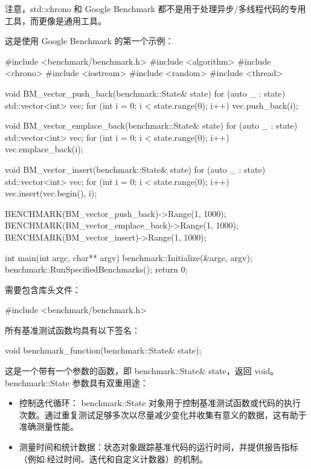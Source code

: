 注意，std::chrono 和 Google Benchmark 都不是用于处理异步/多线程代码的专用工具，而更像是通用工具。

这是使用 Google Benchmark 的第一个示例：

\begin{cpp}
#include <benchmark/benchmark.h>
#include <algorithm>
#include <chrono>
#include <iostream>
#include <random>
#include <thread>

void BM_vector_push_back(benchmark::State& state) {
    for (auto _ : state) {
        std::vector<int> vec;
        for (int i = 0; i < state.range(0); i++) {
            vec.push_back(i);
        }
    }
}

void BM_vector_emplace_back(benchmark::State& state) {
    for (auto _ : state) {
        std::vector<int> vec;
        for (int i = 0; i < state.range(0); i++) {
            vec.emplace_back(i);
        }
    }
}

void BM_vector_insert(benchmark::State& state) {
    for (auto _ : state) {
        std::vector<int> vec;
        for (int i = 0; i < state.range(0); i++) {
            vec.insert(vec.begin(), i);
        }
    }
}

BENCHMARK(BM_vector_push_back)->Range(1, 1000);
BENCHMARK(BM_vector_emplace_back)->Range(1, 1000);
BENCHMARK(BM_vector_insert)->Range(1, 1000);

int main(int argc, char** argv) {
    benchmark::Initialize(&argc, argv);
    benchmark::RunSpecifiedBenchmarks();
    return 0;
}
\end{cpp}

需要包含库头文件：

\begin{cpp}
#include <benchmark/benchmark.h>
\end{cpp}

所有基准测试函数均具有以下签名：

\begin{cpp}
void benchmark_function(benchmark::State& state);
\end{cpp}

这是一个带有一个参数的函数，即 benchmark::State\& state，返回 void。benchmark::State 参数具有双重用途：

\begin{itemize}
\item
控制迭代循环： benchmark::State 对象用于控制基准测试函数或代码的执行次数。通过重复测试足够多次以尽量减少变化并收集有意义的数据，这有助于准确测量性能。

\item
测量时间和统计数据：状态对象跟踪基准代码的运行时间，并提供报告指标（例如:经过时间、迭代和自定义计数器）的机制。
\end{itemize}

